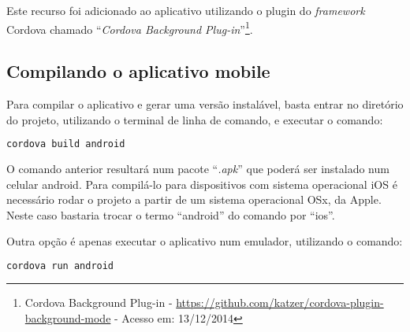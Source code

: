 Este recurso foi adicionado ao aplicativo utilizando o plugin do \textit{framework} Cordova chamado ``\textit{Cordova Background Plug-in}''\footnote{Cordova Background Plug-in - \url{https://github.com/katzer/cordova-plugin-background-mode} - Acesso em: 13/12/2014}.

\subsection{Compilando o aplicativo mobile}
Para compilar o aplicativo e gerar uma versão instalável, basta entrar no diretório do projeto, utilizando o terminal de linha de comando, e executar o comando: 
\begin{lstlisting}[language=Python,caption={Sintaxe padrão para registro de endereço no \textit{router}}]
cordova build android
\end{lstlisting}

O comando anterior resultará num pacote ``\textit{.apk}'' que poderá ser instalado num celular \gls{android}. Para compilá-lo para dispositivos com sistema operacional iOS é necessário rodar o projeto a partir de um sistema operacional OSx, da Apple. Neste caso bastaria trocar o termo ``android'' do comando por ``ios''.

Outra opção é apenas executar o aplicativo num emulador, utilizando o comando:
\begin{lstlisting}[language=Python,caption={Sintaxe padrão para registro de endereço no \textit{router}}]
cordova run android
\end{lstlisting}



